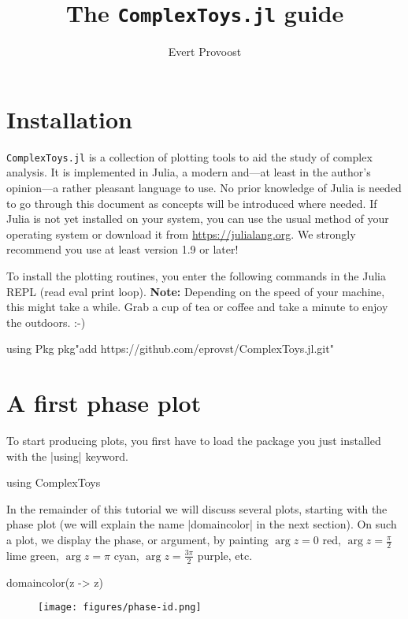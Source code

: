 \documentclass[a4paper]{article}
\title{\vspace*{-1em}The \texttt{ComplexToys.jl} guide}
\author{Evert Provoost}
\date{}
\begin{document}
\maketitle

\section{Installation}

\texttt{ComplexToys.jl} is a collection of
plotting tools to aid the study of complex analysis. It is implemented in Julia,
a modern and---at least in the author's opinion---a rather pleasant language to
use.  No prior knowledge of Julia is needed to go through this document as
concepts will be introduced where needed. If Julia is not yet installed on your
system, you can use the usual method of your operating system or download it
from \url{https://julialang.org}. We strongly recommend you use at least version
1.9 or later!

To install the plotting routines, you enter the following commands in the Julia
REPL (read eval print loop).  \textbf{Note:} Depending on the speed of your
machine, this might take a while. Grab a cup of tea or coffee and take a minute
to enjoy the outdoors. :-)

\begin{juliaverbatim}
	using Pkg
	pkg"add https://github.com/eprovst/ComplexToys.jl.git"
\end{juliaverbatim}

\section{A first phase plot}

To start producing plots, you first have to load the package you just installed
with the \jlv|using| keyword.

\begin{juliaverbatim}
	using ComplexToys
\end{juliaverbatim}

In the remainder of this tutorial we will discuss several plots, starting with
the phase plot (we will explain the name \jlv|domaincolor| in the next
section). On such a plot, we display the phase, or argument, by painting
$\arg z = 0$ red, $\arg z = \frac{\pi}{2}$ lime green, $\arg z = \pi$ cyan,
$\arg z = \frac{3\pi}{2}$ purple, etc.

\begin{juliaverbatim}
	domaincolor(z -> z)
\end{juliaverbatim}
\begin{figure}[H]
	\centering
	\texttt{[image: figures/phase-id.png]}
\end{figure}
\end{document}
